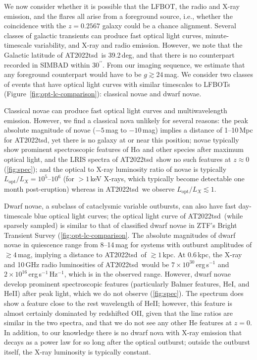 \documentclass{nature_plusfigure}
\newcommand{\at}{AT2022tsd}
\begin{document}
\begin{methods}
We now consider whether it is possible that the LFBOT, the radio and X-ray emission, and the flares all arise from a foreground source, i.e., whether the coincidence with the $z=0.2567$ galaxy could be a chance alignment. 
Several classes of galactic transients can produce fast optical light curves, minute-timescale variability, and X-ray and radio emission. However, we note that the Galactic latitude of \at\ is 39.2\,deg, and that there is no counterpart recorded in SIMBAD within 30$^{\prime\prime}$. From our imaging sequence, we estimate that any foreground counterpart would have to be $g \gtrsim 24\,$mag. We consider two classes of events that have optical light curves with similar timescales to LFBOTs (Figure~\ref{fig:opt-lc-comparison}): classical novae and dwarf novae.

Classical novae can produce fast optical light curves and multiwavelength emission\cite{Chomiuk2021}. However, we find a classical nova unlikely for several reasons: the peak absolute magnitude of novae ($-5\,$mag to $-10\,$mag\cite{Chomiuk2021}) implies a distance of 1--10\,Mpc for \at, yet there is no galaxy at or near this position; novae typically show prominent spectroscopic features of H$\alpha$ and other species after maximum optical light\cite{Chomiuk2021}, and the LRIS spectra of \at\ show no such features at $z\approx0$ (\ref{fig:spec}); and the optical to X-ray luminosity ratio of novae is typically $L_\mathrm{opt}/L_X=10^{5}$--$10^{6}$ (for $>1\,$keV X-rays, which typically become detectable one month post-eruption\cite{Chomiuk2021}) whereas in \at\ we observe $L_\mathrm{opt}/L_X\lesssim1$. 

Dwarf novae, a subclass of cataclysmic variable outbursts, can also have fast day-timescale blue optical light curves; the optical light curve of \at\ (while sparsely sampled) is similar to that of classified dwarf novae in ZTF's Bright Transient Survey\cite{PerleyBTS} (\ref{fig:opt-lc-comparison}. The absolute magnitudes of dwarf novae in quiescence range from 8--14\,mag for systems with outburst amplitudes of $\gtrsim4\,$mag\cite{Szkody2021}, implying a distance to \at\ of $\gtrsim1\,$kpc. At 0.6\,kpc, the X-ray and 10\,GHz radio luminosities of \at\ would be $7\times10^{30}\,$erg\,s$^{-1}$ and $2\times10^{16}$\,erg\,s$^{-1}$\,Hz$^{-1}$, which is in the observed range\cite{Polzin2022,Coppejans2020_CV}. 
However, dwarf novae develop prominent spectroscopic features (particularly Balmer features, HeI, and HeII) after peak light\cite{Morales-Rueda2002,Han2020}, which we do not observe (\ref{fig:spec}). The spectrum does show a feature close to the rest wavelength of HeII; however, this feature is almost certainly dominated by redshifted OII, given that the line ratios are similar in the two spectra, and that we do not see any other He features at $z=0$.
In addition, to our knowledge there is no dwarf nova with X-ray emission that decays as a power law for so long after the optical outburst; outside the outburst itself, the X-ray luminosity is typically constant\cite{Fertig2011}.


\end{methods}
\end{document}
